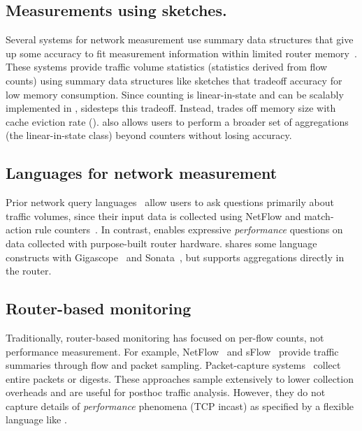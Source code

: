 \subsection{Measurements using sketches.} Several systems for network
measurement use summary data structures that give up some accuracy to fit
measurement information within limited router memory~\cite{univmon, flowradar,
counterbraids, dream, progme, opensketch}. These systems provide traffic volume
statistics (\ie statistics derived from flow counts) using summary data
structures like sketches that tradeoff accuracy for low memory consumption.
Since counting is linear-in-state and can be scalably implemented in
\TheSystem, \TheSystem sidesteps this tradeoff. Instead, \TheSystem trades off
memory size with cache eviction rate ().  \TheSystem also allows
users to perform a broader set of aggregations (the linear-in-state class)
beyond counters without losing accuracy.

\subsection{Languages for network measurement} Prior network query
languages~\cite{gigascope, frenetic, path_query, streaming-monitoring} allow
users to ask questions primarily about traffic volumes, since their input data
is collected using NetFlow and match-action rule counters~\cite{openflow}. In
contrast, \TheSystem enables expressive {\em performance} questions on data
collected with purpose-built router hardware. \TheSystem shares some language
constructs with Gigascope~\cite{gigascope} and
Sonata~\cite{streaming-monitoring}, but supports aggregations directly in the
router.

\subsection{Router-based monitoring} Traditionally, router-based monitoring
has focused on per-flow counts, not performance measurement. For example,
NetFlow~\cite{netflow} and sFlow~\cite{sflow} provide traffic summaries through
flow and packet sampling. Packet-capture systems~\cite{cisco-span, niksun,
netsight, everflow, pathdump, path_query} collect entire packets or digests.
These approaches sample extensively to lower collection overheads and are
useful for posthoc traffic analysis. However, they do not capture details of
{\em performance} phenomena (\eg TCP incast) as specified by a flexible
language like \TheSystem.

